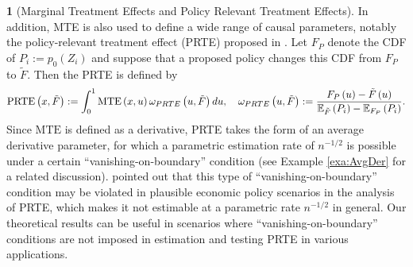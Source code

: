 \documentclass[12pt,american]{article}
\theoremstyle{definition}
\newtheorem{example}{\protect\examplename}
\theoremstyle{plain}
\theoremstyle{definition}
\theoremstyle{plain}
\theoremstyle{plain}
\theoremstyle{plain}
\theoremstyle{plain}
\theoremstyle{plain}
\newcommand{\E}{\mathbb{E}}
\providecommand{\examplename}{Example}
\providecommand{\examplename}{Example}
\begin{document}
\begin{example}[Marginal Treatment Effects and Policy Relevant Treatment Effects]
  In addition, MTE is also used to define a wide range of causal parameters,
  notably the policy-relevant treatment effect (PRTE) proposed in \citet*{heckman2001policy}. Let $F_{P}$ denote the CDF of $P_{i}:=p_{0}\left(Z_{i}\right)$
  and suppose that a proposed policy changes this CDF from $F_{P}$
  to $\tilde{F}$. Then the PRTE is defined by
  \[
    \text{PRTE}\left(x,\tilde{F}\right):=\int_{0}^{1}\text{MTE}\left(x,u\right)\o_{PRTE}\left(u,\tilde{F}\right)du,\quad\o_{PRTE}\left(u,\tilde{F}\right):=\frac{F_{P}\left(u\right)-\tilde{F}\left(u\right)}{\E_{\tilde{F}}\left(P_{i}\right)-\E_{F_{P}}\left(P_{i}\right)}.
  \]
  Since $\text{MTE}$ is defined as a derivative, PRTE takes the form
  of an average derivative parameter, for which a parametric estimation rate of $n^{-1/2}$
  is possible under a certain ``vanishing-on-boundary'' condition (see Example \ref{exa:AvgDer} for a related discussion).
  \citet*{carneiro2010evaluating}
  pointed out that this type of ``vanishing-on-boundary'' condition
  may be violated in plausible economic policy scenarios in the analysis of PRTE, which
  makes it not estimable at a parametric rate $n^{-1/2}$ in general. Our theoretical results can be useful
  in scenarios where ``vanishing-on-boundary'' conditions are not
  imposed in estimation and testing PRTE in various applications.
\end{example}
\end{document}
